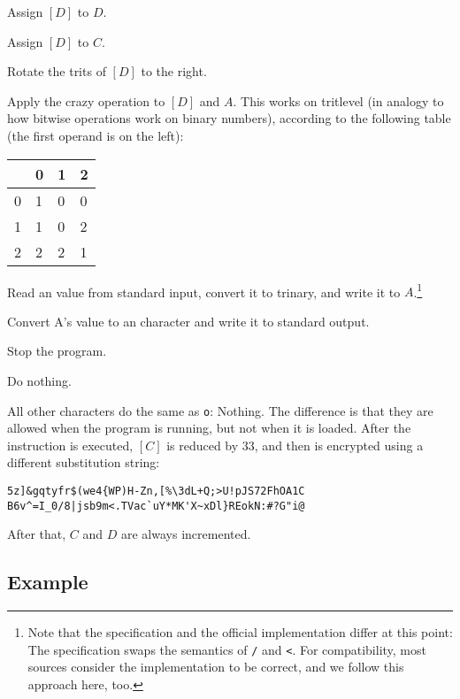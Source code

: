 \begin{description}[labelsep=1em]
    \item[\texttt{j}] Assign $[D]$ to $D$.
    \item[\texttt{i}] Assign $[D]$ to $C$.
    \item[\texttt{*}] Rotate the trits of $[D]$ to the right.
    \item[\texttt{p}] Apply the crazy operation to $[D]$ and $A$. This works on tritlevel (in analogy to how bitwise operations work on binary numbers), according to the following table (the first operand is on the left):

     \begin{tabular}{l|lll}
     & 0 & 1 & 2\\
     \hline
     0 & 1 & 0 & 0\\
     1 & 1 & 0 & 2\\
     2 & 2 & 2 & 1
     \end{tabular}

    \item[\texttt{/}] Read an \ascii{} value from standard input, convert it to trinary, and write it to $A$.\footnote{Note that the specification and the official implementation differ at this point: The specification swaps the semantics of \texttt{/} and \texttt{<}. For compatibility, most sources consider the implementation to be correct, and we follow this approach here, too.}
    \item[\texttt{<}] Convert A's value to an \ascii{} character and write it to standard output.
    \item[\texttt{v}] Stop the program.
    \item[\texttt{o}] Do nothing.
\end{description}

All other characters do the same as \texttt{o}: Nothing. The difference is that they are allowed when the program is running, but not when it is loaded. After the instruction is executed, $[C]$ is reduced by 33, and then is encrypted using a different substitution string:

\begin{lstlisting}[numbers=none,frame=none]
5z]&gqtyfr$(we4{WP)H-Zn,[%\3dL+Q;>U!pJS72FhOA1C
B6v^=I_0/8|jsb9m<.TVac`uY*MK'X~xDl}REokN:#?G"i@
\end{lstlisting}

After that, $C$ and $D$ are always incremented.

\subsection{Example}
\label{malbolge-example}

